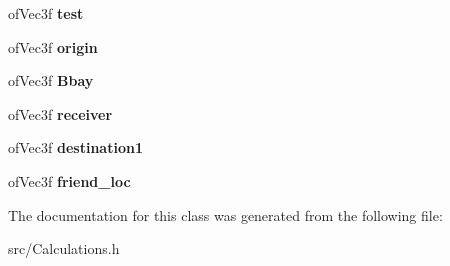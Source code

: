 \begin{DoxyCompactItemize}
\item 
\hypertarget{class_calculations_ad3add50e396d9dc6714193512a3843f8}{of\-Vec3f {\bfseries test}}\label{class_calculations_ad3add50e396d9dc6714193512a3843f8}

\item 
\hypertarget{class_calculations_a7ecf6486498757f0a99ae46bb36cb230}{of\-Vec3f {\bfseries origin}}\label{class_calculations_a7ecf6486498757f0a99ae46bb36cb230}

\item 
\hypertarget{class_calculations_a3ae3e156fdb18968c2395df8563e586c}{of\-Vec3f {\bfseries Bbay}}\label{class_calculations_a3ae3e156fdb18968c2395df8563e586c}

\item 
\hypertarget{class_calculations_ac230e0754ed24bf0ec1396e1ca54df5d}{of\-Vec3f {\bfseries receiver}}\label{class_calculations_ac230e0754ed24bf0ec1396e1ca54df5d}

\item 
\hypertarget{class_calculations_a6c4fa8387539622517e3bb1d0a46b766}{of\-Vec3f {\bfseries destination1}}\label{class_calculations_a6c4fa8387539622517e3bb1d0a46b766}

\item 
\hypertarget{class_calculations_a5f7f606ee1afe8f2c1993a198e334a15}{of\-Vec3f {\bfseries friend\-\_\-loc}}\label{class_calculations_a5f7f606ee1afe8f2c1993a198e334a15}

\end{DoxyCompactItemize}


The documentation for this class was generated from the following file\-:\begin{DoxyCompactItemize}
\item 
src/Calculations.\-h\end{DoxyCompactItemize}
